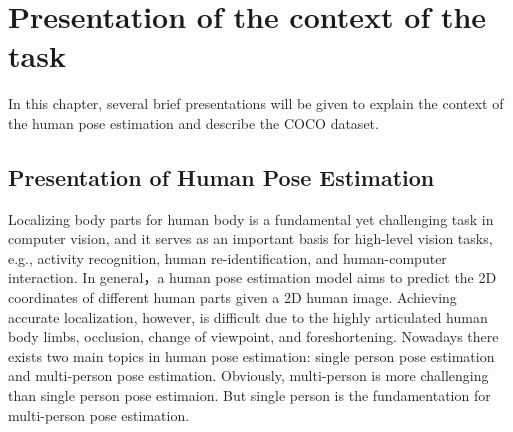 \chapter{Presentation of the context of the task}
\label{sec:intro}
In this chapter, several brief presentations will be given to explain the context of the human pose estimation and describe the COCO dataset.

\section{Presentation of Human Pose Estimation}
\label{sec:isauriam}
Localizing body parts for human body is a fundamental yet challenging task in computer vision, and it serves as an important basis for high-level vision tasks, e.g., activity
recognition\cite{yang2010recognizing, wang2013approach}, human re-identification\cite{zheng2017pose}, and human-computer interaction.
In general，a human pose estimation model aims to predict the 2D coordinates of different human parts given a 2D human image.
Achieving accurate localization, however, is difficult due to the highly articulated human body limbs, occlusion, change of viewpoint, and foreshortening.
Nowadays there exists two main topics in human pose estimation: single person pose estimation and multi-person pose estimation. Obviously, multi-person is more challenging than single person pose estimaion.
But single person is the fundamentation for multi-person pose estimation.




